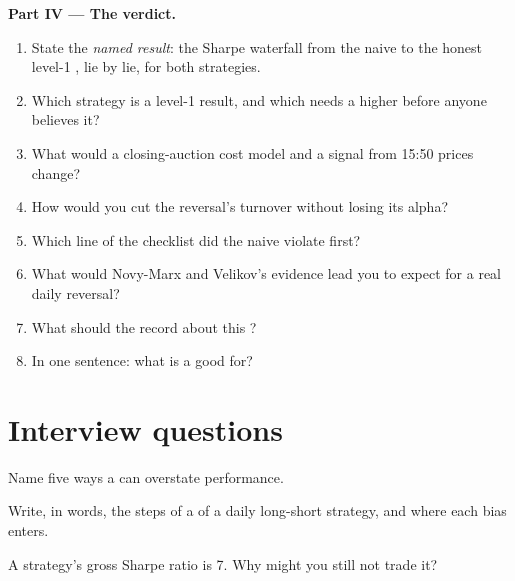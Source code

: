 \begin{problem}
\medskip\noindent\textbf{Part IV --- The verdict.}
\begin{enumerate}[resume]
\item State the \emph{named result}: the Sharpe waterfall from the naive to the honest level-1 , lie by lie, for both strategies.
\item Which strategy is a level-1 result, and which needs a higher  before anyone believes it?
\item What would a closing-auction cost model and a signal from 15:50 prices change?
\item How would you cut the reversal's turnover without losing its alpha?
\item Which line of the checklist did the naive  violate first?
\item What would Novy-Marx and Velikov's evidence lead you to expect for a real daily reversal?
\item What should the  record about this ?
\item In one sentence: what is a  good for?
\end{enumerate}
\end{problem}

\section{Interview questions}

\begin{interviewq}\label{iq:rs:vectorised-backtests:1}
Name five ways a  can overstate performance.
\end{interviewq}

\begin{interviewq}\label{iq:rs:vectorised-backtests:2}
Write, in words, the steps of a  of a daily long-short strategy, and where each bias enters.
\end{interviewq}

\begin{interviewq}\label{iq:rs:vectorised-backtests:3}
A strategy's gross Sharpe ratio is 7. Why might you still not trade it?
\end{interviewq}

